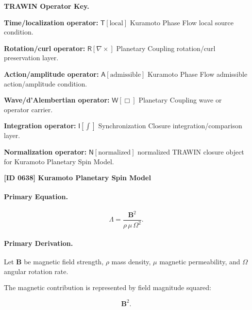\par\vspace{0.45\baselineskip}
\noindent\begin{minipage}[t]{\linewidth}
\begingroup
\small
\raggedright
\textbf{TRAWIN Operator Key.}\par
\noindent\textbf{Time/localization operator:} $\mathsf{T}\!\left[\mathrm{local}\right]$ Kuramoto Phase Flow local source condition.\par
\noindent\textbf{Rotation/curl operator:} $\mathsf{R}\!\left[\nabla\times\right]$ Planetary Coupling rotation/curl preservation layer.\par
\noindent\textbf{Action/amplitude operator:} $\mathsf{A}\!\left[\mathrm{admissible}\right]$ Kuramoto Phase Flow admissible action/amplitude condition.\par
\noindent\textbf{Wave/d'Alembertian operator:} $\mathsf{W}\!\left[\Box\right]$ Planetary Coupling wave or operator carrier.\par
\noindent\textbf{Integration operator:} $\mathsf{I}\!\left[\int\right]$ Synchronization Closure integration/comparison layer.\par
\noindent\textbf{Normalization operator:} $\mathsf{N}\!\left[\mathrm{normalized}\right]$ normalized TRAWIN closure object for Kuramoto Planetary Spin Model.\par
\endgroup
\end{minipage}

\clearpage
\noindent\textbf{[ID 0638] Kuramoto Planetary Spin Model}\par
\vspace{0.35em}
\paragraph{Primary Equation.}
\begin{equation}
\Lambda
=
\frac{\mathbf{B}^2}
{\rho\,\mu\,\Omega^2}.
\end{equation}

\paragraph{Primary Derivation.}
Let $\mathbf{B}$ be magnetic field strength, $\rho$ mass density, $\mu$ magnetic permeability, and $\Omega$ angular rotation rate.

The magnetic contribution is represented by field magnitude squared:

\begin{equation}
\mathbf{B}^2 .
\end{equation}

